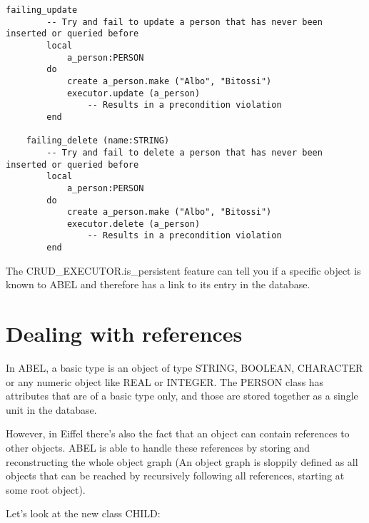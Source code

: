 \begin{lstlisting}[language=OOSC2Eiffel, captionpos=b, caption={}, label={lst:failing_update_delete}]
	failing_update
		-- Try and fail to update a person that has never been inserted or queried before
		local
			a_person:PERSON
		do
			create a_person.make ("Albo", "Bitossi")
			executor.update (a_person)
				-- Results in a precondition violation
		end

	failing_delete (name:STRING)
		-- Try and fail to delete a person that has never been inserted or queried before
		local
			a_person:PERSON
		do
			create a_person.make ("Albo", "Bitossi")
			executor.delete (a_person) 
				-- Results in a precondition violation
		end
\end{lstlisting}

The CRUD\_EXECUTOR.is\_persistent feature can tell you if a specific object is known to ABEL and therefore has a link to its entry in the data\-base.





\section{Dealing with references}
\label {sec:references}

In ABEL, a basic type is an object of type STRING, BOOLEAN, CHARACTER or any numeric object like REAL or INTEGER.
The PERSON class has attributes that are of a basic type only, and those are stored together as a single unit in the database.

However, in Eiffel there's also the fact that an object can contain references to other objects.
ABEL is able to handle these references by storing and reconstructing the whole object graph 
(An object graph is sloppily defined as all objects that can be reached by recursively following all references, starting at some root object).

Let's look at the new class CHILD:

